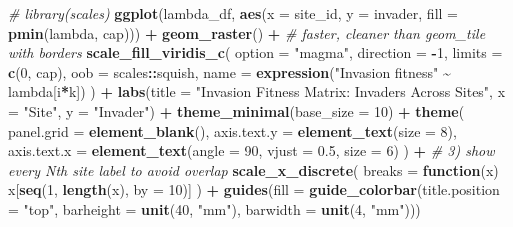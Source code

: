\documentclass[
]{article}
\newenvironment{Shaded}{\begin{snugshade}}{\end{snugshade}}
\newcommand{\AttributeTok}[1]{\textcolor[rgb]{0.13,0.29,0.53}{#1}}
\newcommand{\CommentTok}[1]{\textcolor[rgb]{0.56,0.35,0.01}{\textit{#1}}}
\newcommand{\ControlFlowTok}[1]{\textcolor[rgb]{0.13,0.29,0.53}{\textbf{#1}}}
\newcommand{\DecValTok}[1]{\textcolor[rgb]{0.00,0.00,0.81}{#1}}
\newcommand{\FloatTok}[1]{\textcolor[rgb]{0.00,0.00,0.81}{#1}}
\newcommand{\FunctionTok}[1]{\textcolor[rgb]{0.13,0.29,0.53}{\textbf{#1}}}
\newcommand{\NormalTok}[1]{#1}
\newcommand{\SpecialCharTok}[1]{\textcolor[rgb]{0.81,0.36,0.00}{\textbf{#1}}}
\newcommand{\StringTok}[1]{\textcolor[rgb]{0.31,0.60,0.02}{#1}}
\begin{document}
\begin{Shaded}
\begin{Highlighting}[]
\CommentTok{\# library(scales)}
\FunctionTok{ggplot}\NormalTok{(lambda\_df, }\FunctionTok{aes}\NormalTok{(}\AttributeTok{x =}\NormalTok{ site\_id, }\AttributeTok{y =}\NormalTok{ invader, }\AttributeTok{fill =} \FunctionTok{pmin}\NormalTok{(lambda, cap))) }\SpecialCharTok{+}
  \FunctionTok{geom\_raster}\NormalTok{() }\SpecialCharTok{+}  \CommentTok{\# faster, cleaner than geom\_tile with borders}
  \FunctionTok{scale\_fill\_viridis\_c}\NormalTok{(}
    \AttributeTok{option =} \StringTok{"magma"}\NormalTok{, }\AttributeTok{direction =} \SpecialCharTok{{-}}\DecValTok{1}\NormalTok{,}
    \AttributeTok{limits =} \FunctionTok{c}\NormalTok{(}\DecValTok{0}\NormalTok{, cap), }\AttributeTok{oob =}\NormalTok{ scales}\SpecialCharTok{::}\NormalTok{squish,}
    \AttributeTok{name =} \FunctionTok{expression}\NormalTok{(}\StringTok{"Invasion fitness"} \SpecialCharTok{\textasciitilde{}}\NormalTok{ lambda[i}\SpecialCharTok{*}\NormalTok{k])}
\NormalTok{  ) }\SpecialCharTok{+}
  \FunctionTok{labs}\NormalTok{(}\AttributeTok{title =} \StringTok{"Invasion Fitness Matrix: Invaders Across Sites"}\NormalTok{,}
       \AttributeTok{x =} \StringTok{"Site"}\NormalTok{, }\AttributeTok{y =} \StringTok{"Invader"}\NormalTok{) }\SpecialCharTok{+}
  \FunctionTok{theme\_minimal}\NormalTok{(}\AttributeTok{base\_size =} \DecValTok{10}\NormalTok{) }\SpecialCharTok{+}
  \FunctionTok{theme}\NormalTok{(}
    \AttributeTok{panel.grid =} \FunctionTok{element\_blank}\NormalTok{(),}
    \AttributeTok{axis.text.y =} \FunctionTok{element\_text}\NormalTok{(}\AttributeTok{size =} \DecValTok{8}\NormalTok{),}
    \AttributeTok{axis.text.x =} \FunctionTok{element\_text}\NormalTok{(}\AttributeTok{angle =} \DecValTok{90}\NormalTok{, }\AttributeTok{vjust =} \FloatTok{0.5}\NormalTok{, }\AttributeTok{size =} \DecValTok{6}\NormalTok{)}
\NormalTok{  ) }\SpecialCharTok{+}
  \CommentTok{\# 3) show every Nth site label to avoid overlap}
  \FunctionTok{scale\_x\_discrete}\NormalTok{(}
    \AttributeTok{breaks =} \ControlFlowTok{function}\NormalTok{(x) x[}\FunctionTok{seq}\NormalTok{(}\DecValTok{1}\NormalTok{, }\FunctionTok{length}\NormalTok{(x), }\AttributeTok{by =} \DecValTok{10}\NormalTok{)]}
\NormalTok{  ) }\SpecialCharTok{+}
  \FunctionTok{guides}\NormalTok{(}\AttributeTok{fill =} \FunctionTok{guide\_colorbar}\NormalTok{(}\AttributeTok{title.position =} \StringTok{"top"}\NormalTok{,}
                               \AttributeTok{barheight =} \FunctionTok{unit}\NormalTok{(}\DecValTok{40}\NormalTok{, }\StringTok{"mm"}\NormalTok{),}
                               \AttributeTok{barwidth  =} \FunctionTok{unit}\NormalTok{(}\DecValTok{4}\NormalTok{, }\StringTok{"mm"}\NormalTok{)))}
\end{Highlighting}
\end{Shaded}
\end{document}
